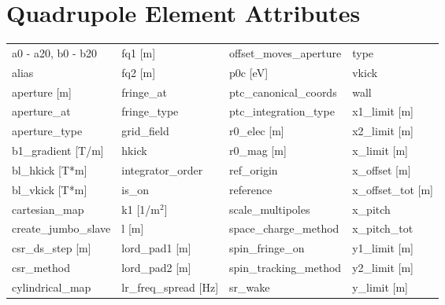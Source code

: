  \section{Quadrupole Element Attributes}
 \label{s:list.quadrupole}
 
 \begin{tabular}{llll} \toprule
a0 - a20, b0 - b20               & fq1 [m]                          & offset_moves_aperture            & type                             \\
alias                            & fq2 [m]                          & p0c [eV]                         & vkick                            \\
aperture [m]                     & fringe_at                        & ptc_canonical_coords             & wall                             \\
aperture_at                      & fringe_type                      & ptc_integration_type             & x1_limit [m]                     \\
aperture_type                    & grid_field                       & r0_elec [m]                      & x2_limit [m]                     \\
b1_gradient [T/m]                & hkick                            & r0_mag [m]                       & x_limit [m]                      \\
bl_hkick [T*m]                   & integrator_order                 & ref_origin                       & x_offset [m]                     \\
bl_vkick [T*m]                   & is_on                            & reference                        & x_offset_tot [m]                 \\
cartesian_map                    & k1 [1/m$^2$]                     & scale_multipoles                 & x_pitch                          \\
create_jumbo_slave               & l [m]                            & space_charge_method              & x_pitch_tot                      \\
csr_ds_step [m]                  & lord_pad1 [m]                    & spin_fringe_on                   & y1_limit [m]                     \\
csr_method                       & lord_pad2 [m]                    & spin_tracking_method             & y2_limit [m]                     \\
cylindrical_map                  & lr_freq_spread [Hz]              & sr_wake                          & y_limit [m]                      \\

\end{tabular}
